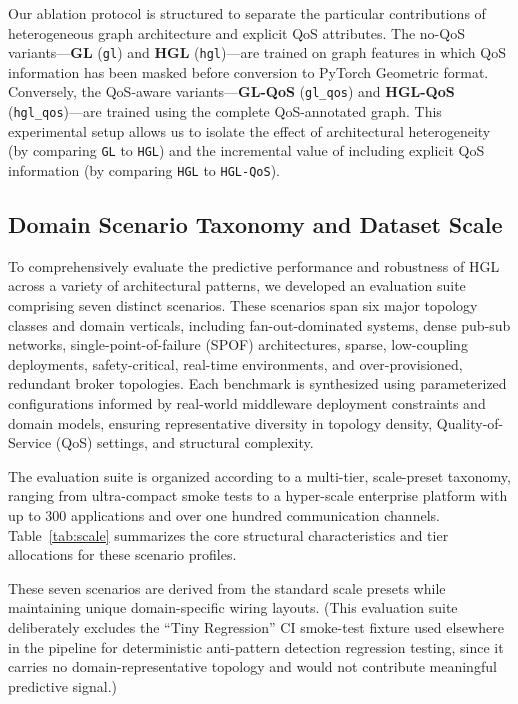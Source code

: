 \documentclass[review]{elsarticle}
\begin{document}
Our ablation protocol is structured to separate the particular contributions of heterogeneous graph
architecture and explicit QoS attributes. The no-QoS variants---\textbf{GL} (\texttt{gl}) and
\textbf{HGL} (\texttt{hgl})---are trained on graph features in which QoS information has been
masked before conversion to PyTorch Geometric format. Conversely, the QoS-aware
variants---\textbf{GL-QoS} (\texttt{gl\_qos}) and \textbf{HGL-QoS} (\texttt{hgl\_qos})---are trained
using the complete QoS-annotated graph. This experimental setup allows us to isolate the effect of
architectural heterogeneity (by comparing \texttt{GL} to \texttt{HGL}) and the incremental value of
including explicit QoS information (by comparing \texttt{HGL} to \texttt{HGL-QoS}).

\subsection{Domain Scenario Taxonomy and Dataset Scale}

To comprehensively evaluate the predictive performance and robustness of HGL across a variety of
architectural patterns, we developed an evaluation suite comprising seven distinct scenarios. These
scenarios span six major topology classes and domain verticals, including fan-out-dominated
systems, dense pub-sub networks, single-point-of-failure (SPOF) architectures, sparse,
low-coupling deployments, safety-critical, real-time environments, and over-provisioned, redundant
broker topologies. Each benchmark is synthesized using parameterized configurations informed by
real-world middleware deployment constraints and domain models, ensuring representative diversity
in topology density, Quality-of-Service (QoS) settings, and structural complexity.

The evaluation suite is organized according to a multi-tier, scale-preset taxonomy, ranging from
ultra-compact smoke tests to a hyper-scale enterprise platform with up to 300 applications and over
one hundred communication channels. Table~\ref{tab:scale} summarizes the core structural
characteristics and tier allocations for these scenario profiles.

These seven scenarios are derived from the standard scale presets while maintaining unique
domain-specific wiring layouts. (This evaluation suite deliberately excludes the ``Tiny Regression''
CI smoke-test fixture used elsewhere in the pipeline for deterministic anti-pattern detection
regression testing, since it carries no domain-representative topology and would not contribute
meaningful predictive signal.)
\end{document}
